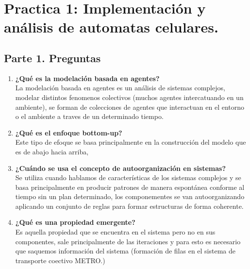 \documentclass[12pt]{article}
\begin{document}

{\color{red} \section*{Practica 1: Implementación y análisis de automatas celulares.}}

{\color{blue} \subsection*{Parte 1. Preguntas}}
\vspace{1em}

\begin{enumerate}
    \item \textbf{¿Qué es la modelación basada en agentes?}\\
    La modelación basada en agentes es un análisis de sistemas complejos, modelar distintos fenomenos
    colectivos (muchos agentes intercatuando en un ambiente), se forman de colecciones de agentes que interactuan en el entorno o el ambiente a traves de un determinado tiempo.

    \item \textbf{¿Qué es el enfoque bottom-up?}\\
    Este tipo de efoque se basa principalmente en la construcción del modelo que es de abajo hacia arriba,
    \item \textbf{¿Cuándo se usa el concepto de autoorganización en sistemas?}\\
    Se utiliza cuando hablamos de características de los sistemas complejos y se basa principalmente en producir patrones
    de manera espontánea conforme al tiempo sin un plan determinado, los componementes se van autoorganizando aplicando un conjunto de reglas para formar estructuras
    de forma coherente.
    \item \textbf{¿Qué es una propiedad emergente?}\\
    Es aquella propiedad que se encuentra en el sistema pero no en sus componentes, sale principalmente de las iteraciones y para esto es necesario que saquemos
    información del sistema (formación de filas en el sistema de transporte coectivo METRO.)
\end{enumerate}
\end{document}
